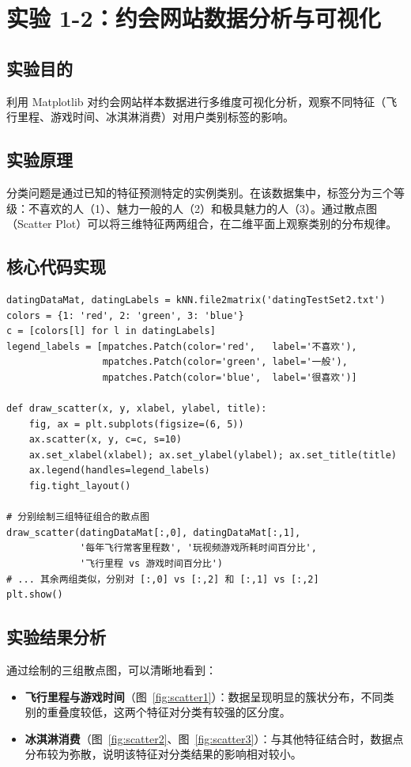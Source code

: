 \documentclass[10.5pt]{config}
\date{\today}
\begin{document}
\makeheader %

\section{实验 1-2：约会网站数据分析与可视化}

\subsection{实验目的}
利用 Matplotlib 对约会网站样本数据进行多维度可视化分析，观察不同特征（飞行里程、游戏时间、冰淇淋消费）对用户类别标签的影响。

\subsection{实验原理}
分类问题是通过已知的特征预测特定的实例类别。在该数据集中，标签分为三个等级：不喜欢的人（1）、魅力一般的人（2）和极具魅力的人（3）。通过散点图（Scatter Plot）可以将三维特征两两组合，在二维平面上观察类别的分布规律。

\subsection{核心代码实现}
\begin{listing}[H]
\begin{verbatim}
datingDataMat, datingLabels = kNN.file2matrix('datingTestSet2.txt')
colors = {1: 'red', 2: 'green', 3: 'blue'}
c = [colors[l] for l in datingLabels]
legend_labels = [mpatches.Patch(color='red',   label='不喜欢'),
                 mpatches.Patch(color='green', label='一般'),
                 mpatches.Patch(color='blue',  label='很喜欢')]

def draw_scatter(x, y, xlabel, ylabel, title):
    fig, ax = plt.subplots(figsize=(6, 5))
    ax.scatter(x, y, c=c, s=10)
    ax.set_xlabel(xlabel); ax.set_ylabel(ylabel); ax.set_title(title)
    ax.legend(handles=legend_labels)
    fig.tight_layout()

# 分别绘制三组特征组合的散点图
draw_scatter(datingDataMat[:,0], datingDataMat[:,1],
             '每年飞行常客里程数', '玩视频游戏所耗时间百分比',
             '飞行里程 vs 游戏时间百分比')
# ... 其余两组类似，分别对 [:,0] vs [:,2] 和 [:,1] vs [:,2]
plt.show()
\end{verbatim}
\caption{数据可视化完整代码 (Data\_display.py)}
\end{listing}

\subsection{实验结果分析}
通过绘制的三组散点图，可以清晰地看到：
\begin{itemize}
    \item \textbf{飞行里程与游戏时间}（图~\ref{fig:scatter1}）：数据呈现明显的簇状分布，不同类别的重叠度较低，这两个特征对分类有较强的区分度。
    \item \textbf{冰淇淋消费}（图~\ref{fig:scatter2}、图~\ref{fig:scatter3}）：与其他特征结合时，数据点分布较为弥散，说明该特征对分类结果的影响相对较小。
\end{itemize}
\end{document}
